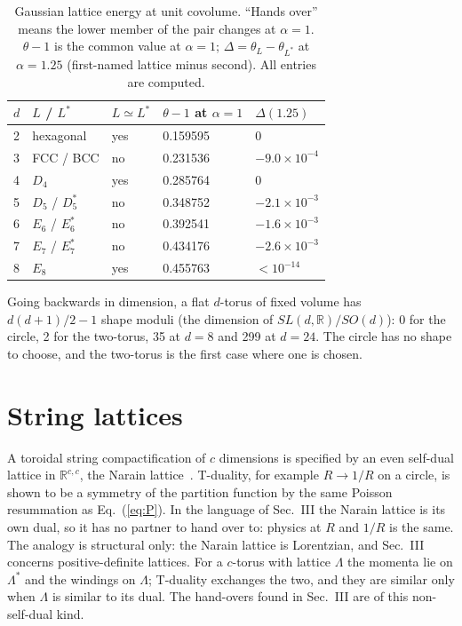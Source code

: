 \documentclass[aps,prd,twocolumn,superscriptaddress,nofootinbib,showkeys]{revtex4-2}
\begin{document}
\begin{table}[t]
\caption{Gaussian lattice energy at unit covolume. ``Hands over'' means the lower member of the pair changes at $\alpha=1$. $\theta-1$ is the common value at $\alpha=1$; $\Delta=\theta_L-\theta_{L^*}$ at $\alpha=1.25$ (first-named lattice minus second). All entries are computed.}
\label{tab:flip}
\begin{ruledtabular}\footnotesize
\begin{tabular}{lllll}
$d$ & $L$ / $L^*$ & $L\simeq L^*$ & $\theta-1$ at $\alpha=1$ & $\Delta(1.25)$\\ \hline
2 & hexagonal & yes & 0.159595 & 0\\
3 & FCC / BCC & no & 0.231536 & $-9.0\times10^{-4}$\\
4 & $D_4$ & yes & 0.285764 & 0\\
5 & $D_5$ / $D_5^*$ & no & 0.348752 & $-2.1\times10^{-3}$\\
6 & $E_6$ / $E_6^*$ & no & 0.392541 & $-1.6\times10^{-3}$\\
7 & $E_7$ / $E_7^*$ & no & 0.434176 & $-2.6\times10^{-3}$\\
8 & $E_8$ & yes & 0.455763 & $<10^{-14}$
\end{tabular}
\end{ruledtabular}
\end{table}

Going backwards in dimension, a flat $d$-torus of fixed volume has $d(d+1)/2-1$ shape moduli (the dimension of $SL(d,\mathbb R)/SO(d)$): 0 for the circle, 2 for the two-torus, 35 at $d=8$ and 299 at $d=24$. The circle has no shape to choose, and the two-torus is the first case where one is chosen.

\section{String lattices}
A toroidal string compactification of $c$ dimensions is specified by an even self-dual lattice in $\mathbb R^{c,c}$, the Narain lattice~\cite{Narain}. T-duality, for example $R\to1/R$ on a circle, is shown to be a symmetry of the partition function by the same Poisson resummation as Eq.~(\ref{eq:P}). In the language of Sec.~III the Narain lattice is its own dual, so it has no partner to hand over to: physics at $R$ and $1/R$ is the same. The analogy is structural only: the Narain lattice is Lorentzian, and Sec.~III concerns positive-definite lattices. For a $c$-torus with lattice $\Lambda$ the momenta lie on $\Lambda^*$ and the windings on $\Lambda$; T-duality exchanges the two, and they are similar only when $\Lambda$ is similar to its dual. The hand-overs found in Sec.~III are of this non-self-dual kind.
\end{document}
